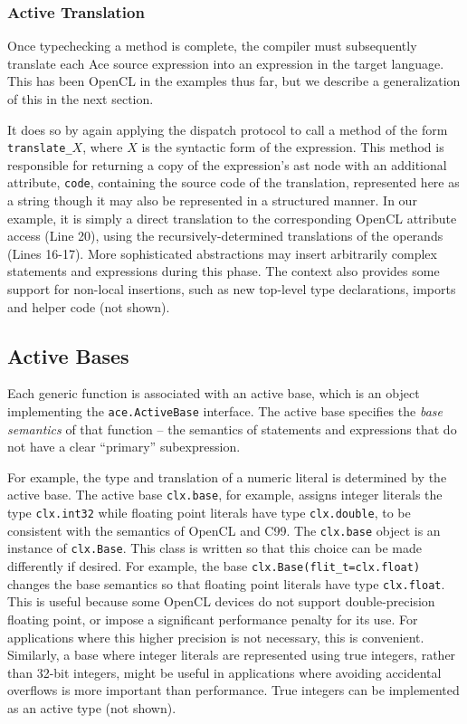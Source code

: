 \documentclass[9pt,preprint]{sigplanconf}
\begin{document}
\subsubsection{Active Translation}
Once typechecking a method is complete, the compiler must subsequently translate each Ace source expression into an expression in the target language. This has been OpenCL in the examples thus far, but we describe a generalization of this in the next section. 

It does so by again applying the dispatch protocol to call a method of the form \verb|translate_|$X$, where $X$ is the syntactic form of the expression. This method is responsible for returning a copy of the expression's ast node with an additional attribute, \verb|code|, containing the source code of the translation, represented here as a string though it may also be represented in a structured manner. In our example, it is simply a direct translation to the corresponding OpenCL attribute access (Line 20), using the recursively-determined translations of the operands (Lines 16-17).  More sophisticated abstractions may insert arbitrarily complex statements and expressions during this phase. The context also provides some support for non-local insertions, such as new top-level type declarations, imports and helper code (not shown).

\subsection{Active Bases}\label{abases}
Each generic function is associated with an active base, which is an object implementing the \verb|ace.ActiveBase| interface. The active base specifies the \emph{base semantics} of that function -- the semantics of statements and expressions that do not have a clear ``primary'' subexpression. 

For example, the type and translation of a numeric literal is determined by the active base. The active base \verb|clx.base|, for example, assigns integer literals the type \verb|clx.int32| while floating point literals have type \verb|clx.double|, to be consistent with the semantics of OpenCL and C99. The \verb|clx.base| object is an instance of \verb|clx.Base|. This class is written so that this choice can be made differently if desired. For example, the base \verb|clx.Base(flit_t=clx.float)| changes the base semantics so that floating point literals have type \verb|clx.float|. This is useful because some OpenCL devices do not support double-precision floating point, or impose a significant performance penalty for its use. For applications where this higher precision is not necessary, this is convenient. Similarly, a base where integer literals are represented using true integers, rather than 32-bit integers, might be useful in  applications where avoiding accidental overflows is more important than performance. True integers can be implemented as an active type (not shown).
\end{document}
